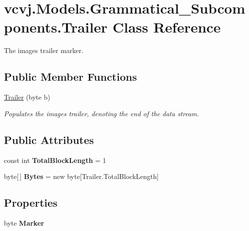 \hypertarget{classvcvj_1_1_models_1_1_grammatical___subcomponents_1_1_trailer}{}\section{vcvj.\+Models.\+Grammatical\+\_\+\+Subcomponents.\+Trailer Class Reference}
\label{classvcvj_1_1_models_1_1_grammatical___subcomponents_1_1_trailer}


The image\textquotesingle{}s trailer marker.  


\subsection*{Public Member Functions}
\begin{DoxyCompactItemize}
\item 
\hyperlink{classvcvj_1_1_models_1_1_grammatical___subcomponents_1_1_trailer_ab118002aebcca587e251ae6864f290a7}{Trailer} (byte b)
\begin{DoxyCompactList}\small\item\em Populates the image\textquotesingle{}s trailer, denoting the end of the data stream. \end{DoxyCompactList}\end{DoxyCompactItemize}
\subsection*{Public Attributes}
\begin{DoxyCompactItemize}
\item 
const int {\bfseries Total\+Block\+Length} = 1\hypertarget{classvcvj_1_1_models_1_1_grammatical___subcomponents_1_1_trailer_a15ebcc9e920e57c56924ffc0cf3815d2}{}\label{classvcvj_1_1_models_1_1_grammatical___subcomponents_1_1_trailer_a15ebcc9e920e57c56924ffc0cf3815d2}

\item 
byte\mbox{[}$\,$\mbox{]} {\bfseries Bytes} = new byte\mbox{[}Trailer.\+Total\+Block\+Length\mbox{]}\hypertarget{classvcvj_1_1_models_1_1_grammatical___subcomponents_1_1_trailer_a6b063b6a4b09044b06de6089f8defb61}{}\label{classvcvj_1_1_models_1_1_grammatical___subcomponents_1_1_trailer_a6b063b6a4b09044b06de6089f8defb61}

\end{DoxyCompactItemize}
\subsection*{Properties}
\begin{DoxyCompactItemize}
\item 
byte {\bfseries Marker}\hypertarget{classvcvj_1_1_models_1_1_grammatical___subcomponents_1_1_trailer_a6cc95c6b7466d1fd5b2da944b95d3586}{}\label{classvcvj_1_1_models_1_1_grammatical___subcomponents_1_1_trailer_a6cc95c6b7466d1fd5b2da944b95d3586}

\end{DoxyCompactItemize}


